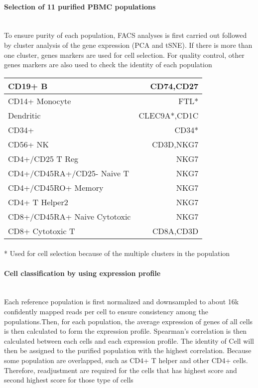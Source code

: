 \documentclass{article}
\begin{document}
\paragraph{Selection of 11 purified PBMC populations} ~\\
To ensure purity of each population, FACS analyses is first carried out followed by cluster analysis of the gene expression (PCA and tSNE). If there is more than one cluster, genes markers are used for cell selection. For quality control, other genes markers are also used to check the identity of each population \\
\par
\begin{tabular}{ |l| r| }
\hline
CD19+ B&CD74,CD27 \\ \hline
CD14+ Monocyte&FTL* \\ \hline       
Dendritic&CLEC9A*,CD1C \\ \hline     
CD34+&CD34*\\ \hline
CD56+ NK&CD3D,NKG7 \\ \hline
CD4+/CD25 T Reg& NKG7 \\ \hline
CD4+/CD45RA+/CD25- Naive T&NKG7 \\ \hline
CD4+/CD45RO+ Memory&NKG7 \\ \hline
CD4+ T Helper2&NKG7 \\ \hline
CD8+/CD45RA+ Naive Cytotoxic& NKG7 \\ \hline 
CD8+ Cytotoxic T&CD8A,CD3D\\ \hline
\end{tabular}
\par
\paragraph{}
* Used for cell selection because of the multiple clusters in the population
\paragraph{Cell classification by using expression profile } ~\\
Each reference population is first normalized and   downsampled to about 16k confidently mapped reads per cell to ensure consistency among the populations.Then, for each population, the average expression of genes of all cells is then calculated to form the expression profile. Spearman’s correlation is then calculated between each cells and each expression profile. The identity of Cell will then be assigned to the purified population with the highest correlation. Because some population are overlapped, such as CD4+ T helper and other CD4+ cells. Therefore, readjustment are required for the cells that has highest score and second highest score for those type of cells     
\end{document}
